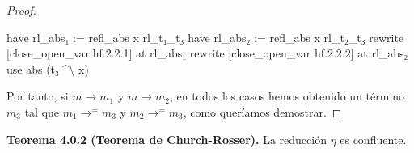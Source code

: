 \documentclass[
  spanish,
  letterpaper,
  DIV=11,
  numbers=noendperiod]{scrreprt}
\newenvironment{Shaded}{\begin{snugshade}}{\end{snugshade}}
\newcommand{\KeywordTok}[1]{\textcolor[rgb]{0.00,0.23,0.31}{\textbf{#1}}}
\newcommand{\NormalTok}[1]{\textcolor[rgb]{0.00,0.23,0.31}{#1}}
\renewcommand{\NormalTok}[1]{\textcolor[HTML]{000000}{#1}}
\renewcommand{\KeywordTok}[1]{\textcolor[HTML]{0000FF}{#1}}
\theoremstyle{remark}
\begin{document}
\begin{proof}
\begin{Shaded}
\begin{Highlighting}[]
      \KeywordTok{have}\NormalTok{ rl\_abs₁ := refl\_abs x rl\_t₁\_t₃}
      \KeywordTok{have}\NormalTok{ rl\_abs₂ := refl\_abs x rl\_t₂\_t₃}
      \KeywordTok{rewrite}\NormalTok{ [close\_open\_var hf.2.2.1] }\KeywordTok{at}\NormalTok{ rl\_abs₁}
      \KeywordTok{rewrite}\NormalTok{ [close\_open\_var hf.2.2.2] }\KeywordTok{at}\NormalTok{ rl\_abs₂}
\NormalTok{      use abs (t₃ \^{}\textbackslash{} x)}
\end{Highlighting}
\end{Shaded}

Por tanto, si \(m\longrightarrow m_1\) y \(m\longrightarrow m_2\), en
todos los casos hemos obtenido un término \(m_3\) tal que
\(m_1\longrightarrow^{=}m_3\) y \(m_2\longrightarrow^{=}m_3\), como
queríamos demostrar.
\end{proof}

\textbf{Teorema 4.0.2 (Teorema de Church-Rosser).} La reducción \(\eta\)
es confluente.
\end{document}
